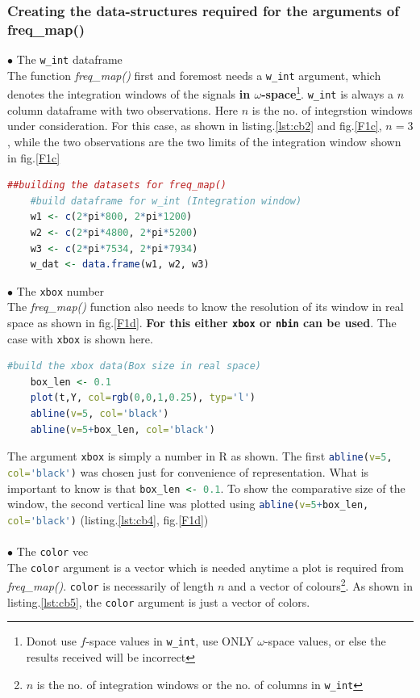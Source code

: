 \documentclass{article}
\begin{document}
 \subsubsection{Creating the data-structures required for the arguments of freq\_map()}
 $\bullet$ The \lstinline[language=R]|w_int| dataframe\\
 The function \textit{freq\_map()} first and foremost needs a \lstinline[language=R]|w_int| argument, which denotes the integration windows of the signals \textbf{in $\omega$-space}\footnote{Donot use $f$-space values in \lstinline[language=R]|w_int|, use ONLY $\omega$-space values, or else the results received will be incorrect}. \lstinline[language=R]|w_int| is always a $n$ column dataframe with two observations. Here $n$ is the no. of integrstion windows under consideration. For this case, as shown in listing.\ref{lst:cb2} and fig.\ref{F1c}, $n=3$, while the two observations are the two limits of the integration window shown in fig.\ref{F1c}
  \begin{lstlisting}[language=R, label={lst:cb3}, caption={code for the w\_int dataframe for the three frequency windows in fig.\ref{F1c}}, captionpos=b]
	##building the datasets for freq_map()
	#build dataframe for w_int (Integration window)
	w1 <- c(2*pi*800, 2*pi*1200)
	w2 <- c(2*pi*4800, 2*pi*5200)
	w3 <- c(2*pi*7534, 2*pi*7934)
	w_dat <- data.frame(w1, w2, w3)
 \end{lstlisting}
$\bullet$ The \lstinline[language=R]|xbox| number\\
The \textit{freq\_map()} function also needs to know the resolution of its window in real space as shown in fig.\ref{F1d}. \textbf{For this either \lstinline[language=R]|xbox| or \lstinline[language=R]|nbin| can be used}. The case with \lstinline[language=R]|xbox| is shown here.
\pagebreak
  \begin{lstlisting}[language=R, label={lst:cb4}, caption={code for the xbox number fig.\ref{F1d}}, captionpos=b]
	#build the xbox data(Box size in real space)
	box_len <- 0.1
	plot(t,Y, col=rgb(0,0,1,0.25), typ='l')
	abline(v=5, col='black')
	abline(v=5+box_len, col='black')
\end{lstlisting}
The argument \lstinline[language=R]|xbox| is simply a number in R as shown. The first \lstinline[language=R]|abline(v=5, col='black')| was chosen just for convenience of representation. What is important to know is that \lstinline[language=R]|box_len <- 0.1|. To show the comparative size of the window, the second vertical line was plotted using \lstinline[language=R]|abline(v=5+box_len, col='black')| (listing.\ref{lst:cb4}, fig.\ref{F1d})\\
\\
$\bullet$ The \lstinline[language=R]|color| vec\\
The \lstinline[language=R]|color| argument is a vector which is needed anytime a plot is required from \textit{freq\_map()}.
\lstinline[language=R]|color| is necessarily of length $n$ and a vector of colours\footnote{$n$ is the no. of integration windows or the no. of columns in \lstinline[language=R]|w_int|}. As shown in listing.\ref{lst:cb5}, the \lstinline[language=R]|color| argument is just a vector of colors.
\end{document}
